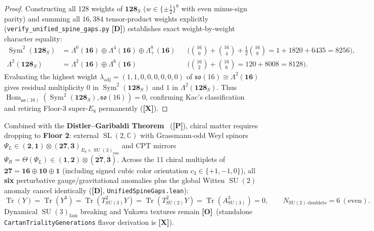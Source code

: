 \documentclass[11pt,a4paper]{article}
\newcommand{\badgeP}{\textbf{\color{sqJade}[P]}}
\newcommand{\badgeD}{\textbf{\color{sqRose}[D]}}
\newcommand{\badgeO}{\textbf{\color{sqAmber}[O]}}
\newcommand{\badgeX}{\textbf{\color{sqKilled}[X]}}
\theoremstyle{definition}
\begin{document}
\begin{proof}
Constructing all 128 weights of $\mathbf{128}_S$ ($w \in \{\pm\frac{1}{2}\}^8$ with even minus-sign parity) and summing all $16{,}384$ tensor-product weights explicitly (\texttt{verify\_unified\_spine\_gaps.py} \badgeD) establishes exact weight-by-weight character equality:
\begin{align}
  \operatorname{Sym}^2(\mathbf{128}_S) &= \Lambda^0(\mathbf{16}) \oplus \Lambda^4(\mathbf{16}) \oplus \Lambda^8_+(\mathbf{16})
  && \Big(\binom{16}{0} + \binom{16}{4} + \frac{1}{2}\binom{16}{8} = 1 + 1820 + 6435 = 8256\Big), \\
  \Lambda^2(\mathbf{128}_S) &= \Lambda^2(\mathbf{16}) \oplus \Lambda^6(\mathbf{16})
  && \Big(\binom{16}{2} + \binom{16}{6} = 120 + 8008 = 8128\Big).
\end{align}
Evaluating the highest weight $\lambda_{\mathrm{adj}} = (1,1,0,0,0,0,0,0)$ of $\mathfrak{so}(16) \cong \Lambda^2(\mathbf{16})$ gives residual multiplicity $0$ in $\operatorname{Sym}^2(\mathbf{128}_S)$ and $1$ in $\Lambda^2(\mathbf{128}_S)$. Thus $\operatorname{Hom}_{\mathfrak{so}(16)}(\operatorname{Sym}^2(\mathbf{128}_S), \mathfrak{so}(16)) = 0$, confirming Kac's classification~\cite{Kac1977} and retiring Floor-3 super-$E_8$ permanently (\badgeX).
\end{proof}

Combined with the \textbf{Distler--Garibaldi Theorem}~\cite{DistlerGaribaldi2010} (\badgeP), chiral matter requires dropping to \textbf{Floor 2}: external $\operatorname{SL}(2,\mathbb{C})$ with Grassmann-odd Weyl spinors $\Psi_L \in (\mathbf{2},\mathbf{1})\otimes(\mathbf{27},\mathbf{3})_{E_6\times\operatorname{SU}(3)_{\mathrm{fam}}}$ and CPT mirrors $\Psi_R = \Theta(\Psi_L) \in (\mathbf{1},\mathbf{2})\otimes(\overline{\mathbf{27}},\overline{\mathbf{3}})$. Across the 11 chiral multiplets of $\mathbf{27} = \mathbf{16}\oplus\mathbf{10}\oplus\mathbf{1}$ (including signed cubic color orientation $c_3 \in \{+1,-1,0\}$), all \textbf{six} perturbative gauge/gravitational anomalies plus the global Witten $\operatorname{SU}(2)$ anomaly cancel identically (\badgeD, \texttt{UnifiedSpineGaps.lean}):
\begin{equation}
  \operatorname{Tr}(Y) = \operatorname{Tr}(Y^3) = \operatorname{Tr}(T_{\mathrm{SU}(3)}^2 Y) = \operatorname{Tr}(T_{\mathrm{SU}(2)}^2 Y) = \operatorname{Tr}(A_{\mathrm{SU}(3)}^3) = 0, \qquad N_{\mathrm{SU}(2)\text{-doublets}} = 6\ (\text{even}).
\end{equation}
Dynamical $\operatorname{SU}(3)_{\mathrm{fam}}$ breaking and Yukawa textures remain \badgeO\ (standalone \texttt{CartanTrialityGenerations} flavor derivation is \badgeX).
\end{document}
